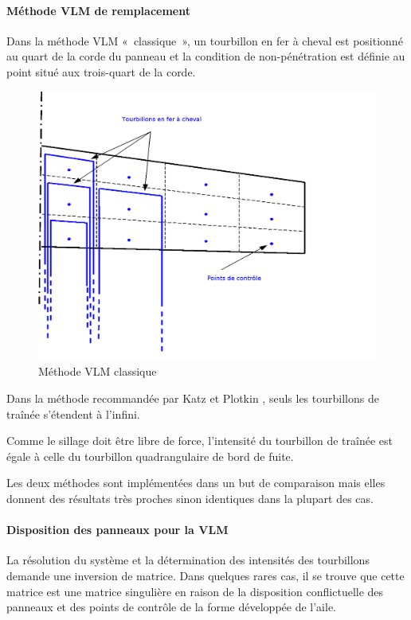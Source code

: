 \documentclass[a4paper,twoside,12pt,dvips]{article}
\begin{document}
\clearpage

\paragraph{Méthode VLM de remplacement}

Dans la méthode VLM «~classique~», un tourbillon en fer à cheval est positionné
au quart de la corde du panneau et la condition de non-pénétration est définie 
au point situé aux trois-quart de la corde. 

\begin{figure}[htbp]
	\centering
	\includegraphics[width=0.7\linewidth]{img-18-fr}
	\caption{Méthode VLM classique}
	\label{img:VLM_classique}
\end{figure}

Dans la méthode recommandée par Katz et Plotkin \cite{Katz}, seuls les tourbillons de traînée s’étendent à l’infini.

Comme le sillage doit être libre de force, l’intensité du tourbillon de traînée est égale à celle du tourbillon quadrangulaire de bord de fuite.

Les deux méthodes sont implémentées dans un but de comparaison mais elles donnent des résultats très proches sinon identiques dans la plupart des cas.

\paragraph{Disposition des panneaux pour la VLM}

La résolution du système et la détermination des intensités des tourbillons demande une inversion de matrice. Dans quelques rares cas, il se trouve que cette matrice est une matrice singulière en raison de la disposition conflictuelle des panneaux et des points de contrôle de la forme développée de l’aile.
\end{document}
